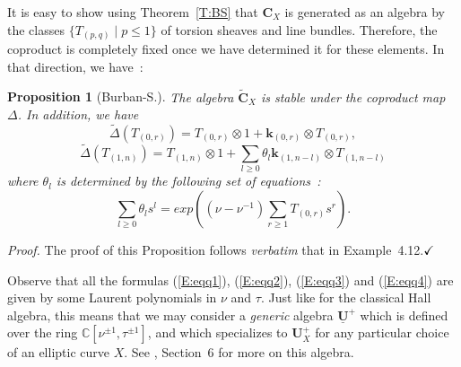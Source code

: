 \documentclass[a4paper,10pt]{amsart}
\def\U{\mathbf{U}}
\def\qed{$\hfill \checkmark$}
\def\C{\mathbb{C}}
\def\CC{\mathbf{C}}
\newtheorem{prop}[theo]{Proposition}
\numberwithin{equation}{section}
\begin{document}
{It is easy to show using Theorem~\ref{T:BS} that $\CC_X$ is generated as an algebra by the classes $\{T_{(p,q)}\;|\; p\leq 1\}$ of torsion sheaves and line bundles. Therefore, the coproduct is completely
fixed once we have determined it for these elements. In that direction, we have~:

\vspace{.1in}

\begin{prop}[Burban-S.] The algebra $\widetilde{\CC}_X$ is stable under the coproduct map $\Delta$. In addition, we have
\begin{equation}\label{E:eqq3}
\widetilde{\Delta}(T_{(0,r)})=T_{(0,r)} \otimes 1 + \mathbf{k}_{(0,r)} \otimes T_{(0,r)},
\end{equation}
\begin{equation}\label{E:eqq4}
\widetilde{\Delta}(T_{(1,n)})=T_{(1,n)} \otimes 1 + \sum_{l \geq 0} \theta_l \mathbf{k}_{(1,n-l)} \otimes T_{(1,n-l)}
\end{equation}
where $\theta_l$ is determined by the following set of equations~:
$$\sum_{l \geq 0} \theta_l s^l=exp((\nu-\nu^{-1})\sum_{r \geq 1} T_{(0,r)}s^r).$$
\end{prop}

\noindent
\textit{Proof.} The proof of this Proposition follows \textit{verbatim} that in Example~4.12.\qed

\vspace{.2in}

Observe that all the formulas (\ref{E:eqq1}), (\ref{E:eqq2}), (\ref{E:eqq3}) and (\ref{E:eqq4}) are given by some Laurent polynomials in $\nu$ and $\tau$. Just like for the classical Hall algebra, this means that we may consider a \textit{generic} algebra $\underline{\U}^+$ which is defined over the ring $\C[\nu^{\pm 1}, \tau^{\pm 1}]$, and which specializes to $\U^+_X$ for any particular choice of an elliptic curve $X$. See \cite{BS}, Section~6 for more on this algebra.

\vspace{.15in}

\addtocounter{theo}{1}
}
\end{document}
